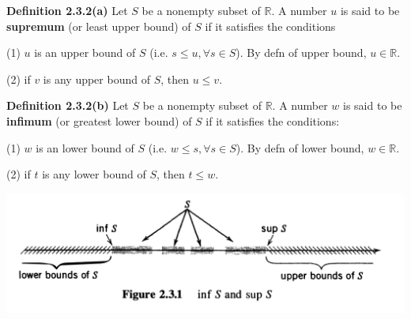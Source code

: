 \documentclass[10pt,landscape]{article}
\begin{document}
\begin{multicols}{4}
\textbf{Definition 2.3.2(a)} Let $S$ be a nonempty subset of $\mathbb{R}$. A number $u$ is said to be \textbf{supremum} (or least upper bound) of $S$ if it satisfies the conditions

(1) $u$ is an upper bound of $S$ (i.e. $s \leq u, \forall s \in S$). By defn of upper bound, $u \in \mathbb{R}$.

(2) if $v$ is any upper bound of $S$, then $u \leq v$.




\textbf{Definition 2.3.2(b)} Let $S$ be a nonempty subset of $\mathbb{R}$. A number $w$ is said to be \textbf{infimum} (or greatest lower bound) of $S$ if it satisfies the conditions:

(1) $w$ is an lower bound of $S$ (i.e. $w \leq s, \forall s \in S$). By defn of lower bound, $w \in \mathbb{R}$.

(2) if $t$ is any lower bound of $S$, then $t \leq w$.







\includegraphics[width=\columnwidth]{images/inf-sup.png}


\end{multicols}
\end{document}
